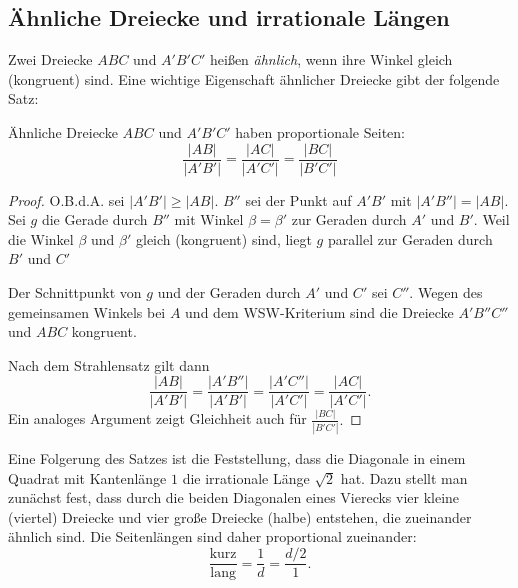 \subsection*{Ähnliche Dreiecke und irrationale Längen}

Zwei Dreiecke $ABC$ und $A'B'C'$ heißen {\em ähnlich}, wenn ihre Winkel gleich (kongruent) sind.
Eine wichtige Eigenschaft ähnlicher Dreiecke gibt der folgende Satz:

\begin{thm}
    Ähnliche Dreiecke $ABC$ und $A'B'C'$ haben proportionale Seiten:
    $$
    \frac{|AB|}{|A'B'|} = \frac{|AC|}{|A'C'|} = \frac{|BC|}{|B'C'|}
    $$
\end{thm}

\begin{proof}
    O.B.d.A. sei $|A'B'| \geq |AB|$. $B''$ sei der Punkt auf $A'B'$ mit $|A'B''| = |AB|$.
    Sei $g$ die Gerade durch $B''$ mit Winkel $\beta = \beta'$ zur Geraden durch $A'$ und $B'$. Weil
    die Winkel $\beta$ und $\beta'$ gleich (kongruent) sind, liegt $g$ parallel zur Geraden durch
    $B'$ und $C'$

    Der Schnittpunkt von $g$ und der Geraden durch $A'$ und $C'$ sei $C''$. Wegen des gemeinsamen
    Winkels bei $A$ und dem WSW-Kriterium sind die Dreiecke $A'B''C''$ und $ABC$ kongruent.

    Nach dem Strahlensatz gilt dann
    $$
    \frac{|AB|}{|A'B'|} = \frac{|A'B''|}{|A'B'|} = \frac{|A'C''|}{|A'C'|} = \frac{|AC|}{|A'C'|} .
    $$
    Ein analoges Argument %
    zeigt Gleichheit auch für
    $\displaystyle \frac{|BC|}{|B'C'|}.$
\end{proof}

Eine Folgerung des Satzes ist die Feststellung, dass die Diagonale in einem Quadrat mit Kantenlänge
$1$ die irrationale Länge $\sqrt{2}$ %
hat. Dazu stellt man zunächst fest, dass durch die beiden Diagonalen eines Vierecks vier kleine
(viertel) Dreiecke und vier große Dreiecke (halbe) entstehen, die zueinander ähnlich sind. Die
Seitenlängen sind daher proportional zueinander:
$$
    \frac{\mbox{kurz}}{\mbox{lang}} = \frac{1}{d} = \frac{d/2}{1}.
$$

